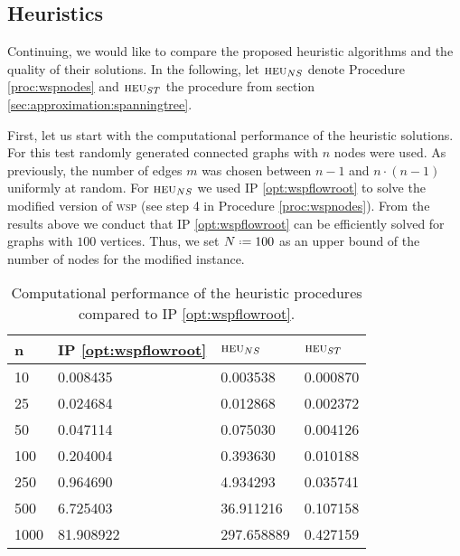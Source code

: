 \subsection{Heuristics}
\label{sec:study:heuristic}

Continuing, we would like to compare the proposed heuristic algorithms and the quality of their solutions. In the following, let $\textsc{heu}_{NS}$ denote Procedure \ref{proc:wspnodes} and $\textsc{heu}_{ST}$ the procedure from section \ref{sec:approximation:spanningtree}.\medskip

First, let us start with the computational performance of the heuristic solutions. For this test randomly generated connected graphs with $n$ nodes were used. As previously, the number of edges $m$ was chosen between $n - 1$ and $n \cdot (n - 1)$ uniformly at random. For $\textsc{heu}_{NS}$ we used IP \ref{opt:wspflowroot} to solve the modified version of \textsc{wsp} (see step 4 in Procedure \ref{proc:wspnodes}). From the results above we conduct that IP \ref{opt:wspflowroot} can be efficiently solved for graphs with $100$ vertices. Thus, we set $N \defeq 100$ as an upper bound of the number of nodes for the modified instance.

\begin{table}[H]
	\centering
	\small
	\begin{tabular}{|l|l|l|l|}
		\hline
		n&IP \ref{opt:wspflowroot}&$\textsc{heu}_{NS}$&$\textsc{heu}_{ST}$\\ \hline
		10&0.008435&0.003538&0.000870\\ \hline
		25&0.024684&0.012868&0.002372\\ \hline
		50&0.047114&0.075030&0.004126\\ \hline
		100&0.204004&0.393630&0.010188\\ \hline
		250&0.964690&4.934293&0.035741\\ \hline
		500&6.725403&36.911216&0.107158\\ \hline
		1000&81.908922&297.658889&0.427159\\ \hline		
	\end{tabular}
	\caption{Computational performance of the heuristic procedures compared to IP \eqref{opt:wspflowroot}.}
	\label{table:heuristictime}
\end{table}

